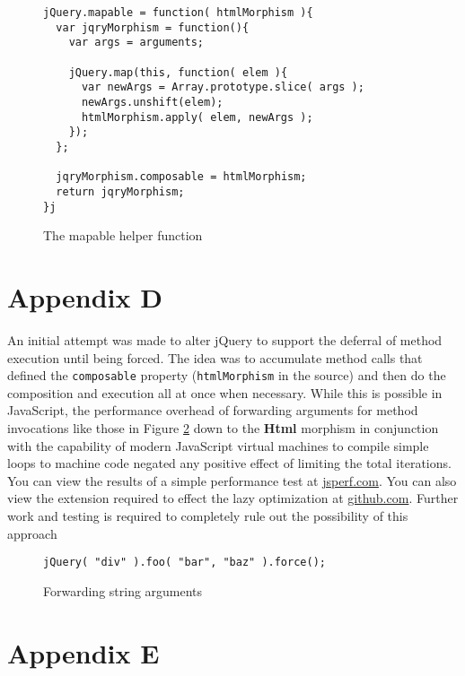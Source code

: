 \documentclass[preprint]{sigplanconf}
\begin{document}
\begin{figure}[!ht]
\small
\begin{verbatim}
jQuery.mapable = function( htmlMorphism ){
  var jqryMorphism = function(){
    var args = arguments;

    jQuery.map(this, function( elem ){
      var newArgs = Array.prototype.slice( args );
      newArgs.unshift(elem);
      htmlMorphism.apply( elem, newArgs );
    });
  };

  jqryMorphism.composable = htmlMorphism;
  return jqryMorphism;
}j
\end{verbatim}
\nocaptionrule \caption{The mapable helper function}
\label{fig:mapable}
\end{figure}

\section{Appendix D}

An initial attempt was made to alter jQuery to support the deferral of method execution until being forced. The idea was to accumulate method calls that defined the \verb|composable| property (\verb|htmlMorphism| in the source) and then do the composition and execution all at once when necessary. While this is possible in JavaScript, the performance overhead of forwarding arguments for method invocations like those in Figure \ref{fig:args-juggle} down to the \textbf{Html} morphism in conjunction with the capability of modern JavaScript virtual machines to compile simple loops to machine code negated any positive effect of limiting the total iterations. You can view the results of a simple performance test at \href{http://jsperf.com/lazy-loop-fusion-vs-traditional-method-chaning/5}{jsperf.com}. You can also view the extension required to effect the lazy optimization at \href{https://github.com/johnbender/jquery-lazy-proxy/blob/79ab61e22547169d6f392512f782df2e29362ebc/lazy.js}{github.com}. Further work and testing is required to completely rule out the possibility of this approach

\begin{figure}[!ht]
\small
\begin{verbatim}
jQuery( "div" ).foo( "bar", "baz" ).force();
\end{verbatim}
\nocaptionrule \caption{Forwarding string arguments}
\label{fig:args-juggle}
\end{figure}

\section{Appendix E}
\end{document}

